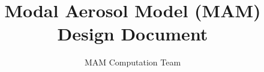 \documentclass[a4paper, 11pt]{article}
\begin{document}
\title{Modal Aerosol Model (MAM) Design Document}
\author{
MAM Computation Team\\
}
\maketitle







\appendix




\nocite{*}

\end{document}
